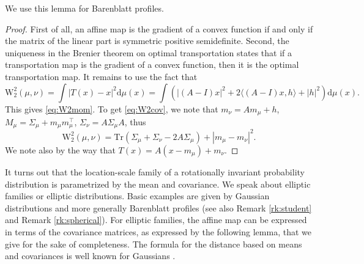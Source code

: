 \documentclass[10pt,reqno]{amsart}
\numberwithin{equation}{section}
\begin{document}
We use this lemma for Barenblatt profiles. 

\begin{proof}
  First of all, an affine map is the gradient of a convex function if and only if the matrix of the linear part is symmetric positive semidefinite.
  Second, the uniqueness in the Brenier theorem on optimal transportation \cite{MR1100809,MR1369395,MR1964483,MR3409718} states that if a transportation map is the gradient of a convex function, then it is the optimal transportation map.
  It remains to use the fact that
  \begin{equation}
   \mathrm{W}_2^2(\mu,\nu)
   =\int|T(x)-x|^2\mathrm{d}\mu(x)
   =\int(|(A-I)x|^2+2\langle(A-I)x,h\rangle+|h|^2)\mathrm{d}\mu(x).
  \end{equation}
  This gives \eqref{eq:W2mom}. To get \eqref{eq:W2cov}, we note that $m_\nu=Am_\mu+h$, $M_\mu=\Sigma_\mu+m_\mu m_\mu^\top$, $\Sigma_\nu=A\Sigma_\mu A$, thus
  \begin{equation}\label{eq:W2A}
   \mathrm{W}_2^2(\mu,\nu)=\mathrm{Tr}(\Sigma_\mu+\Sigma_\nu-2A\Sigma_\mu)+|m_\mu-m_\nu|^2.
  \end{equation}
  We note also by the way that $T(x)=A(x-m_\mu)+m_\nu$.
\end{proof}

It turns out that the location-scale family of a rotationally invariant probability distribution is parametrized by the mean and covariance. We speak about elliptic families or elliptic distributions. Basic examples are given by Gaussian distributions and more generally Barenblatt profiles (see also Remark \ref{rk:student} and Remark \ref{rk:spherical}). For elliptic families, the affine map can be expressed in terms of the covariance matrices, as expressed by the following lemma, that we give for the sake of completeness. The formula for the distance based on means and covariances is well known for Gaussians \cite{MR0752258,MR0745785}. 
\end{document}
